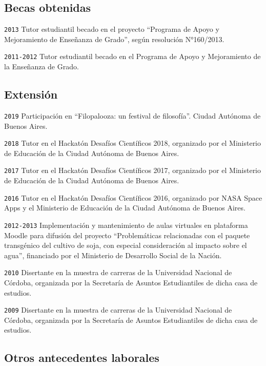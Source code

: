 \documentclass[]{article}
\begin{document}
\hypertarget{becas-obtenidas}{%
\subsection{Becas obtenidas}\label{becas-obtenidas}}

\texttt{2013} Tutor estudiantil becado en el proyecto ``Programa de
Apoyo y Mejoramiento de Enseñanza de Grado'', según resolución
N°160/2013.

\texttt{2011-2012} Tutor estudiantil becado en el Programa de Apoyo y
Mejoramiento de la Enseñanza de Grado.

\hypertarget{extensiuxf3n}{%
\subsection{Extensión}\label{extensiuxf3n}}

\texttt{2019} Participación en ``Filopalooza: un festival de
filosofía''. Ciudad Autónoma de Buenos Aires.

\texttt{2018} Tutor en el Hackatón Desafíos Científicos 2018, organizado
por el Ministerio de Educación de la Ciudad Autónoma de Buenos Aires.

\texttt{2017} Tutor en el Hackatón Desafíos Científicos 2017, organizado
por el Ministerio de Educación de la Ciudad Autónoma de Buenos Aires.

\texttt{2016} Tutor en el Hackatón Desafíos Científicos 2016, organizado
por NASA Space Apps y el Ministerio de Educación de la Ciudad Autónoma
de Buenos Aires.

\texttt{2012-2013} Implementación y mantenimiento de aulas virtuales en
plataforma Moodle para difusión del proyecto ``Problemáticas
relacionadas con el paquete transgénico del cultivo de soja, con
especial consideración al impacto sobre el agua'', financiado por el
Ministerio de Desarrollo Social de la Nación.

\texttt{2010} Disertante en la muestra de carreras de la Universidad
Nacional de Córdoba, organizada por la Secretaría de Asuntos
Estudiantiles de dicha casa de estudios.

\texttt{2009} Disertante en la muestra de carreras de la Universidad
Nacional de Córdoba, organizada por la Secretaría de Asuntos
Estudiantiles de dicha casa de estudios.

\hypertarget{otros-antecedentes-laborales}{%
\subsection{Otros antecedentes
laborales}\label{otros-antecedentes-laborales}}
\end{document}
